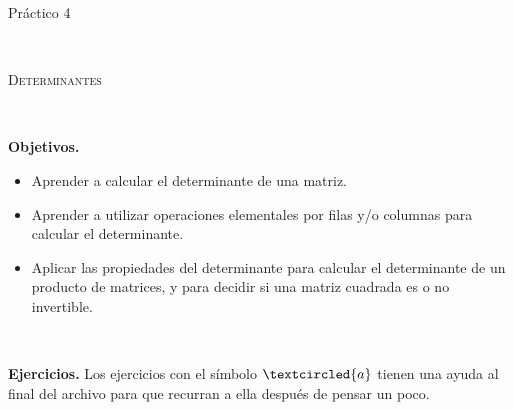 \documentclass[12pt]{amsart}
\begin{document}
	
	
\centerline{\Large{Pr\' actico 4}}
	
\
	
\centerline{\textsc{Determinantes}}

\

\noindent \textbf{Objetivos.}

\begin{itemize}
\item Aprender a calcular el determinante de una matriz.

\item Aprender a utilizar operaciones elementales por filas y/o columnas para calcular el determinante.

\item Aplicar las propiedades del determinante para calcular el determinante de un producto de matrices, y para decidir si una matriz cuadrada es o no invertible.
\end{itemize}
		
\

\noindent \textbf{Ejercicios.} Los ejercicios con el s\'imbolo $\textcircled{a}$ tienen una ayuda al final del archivo para que recurran a ella despu\'es de pensar un poco.
\end{document}
